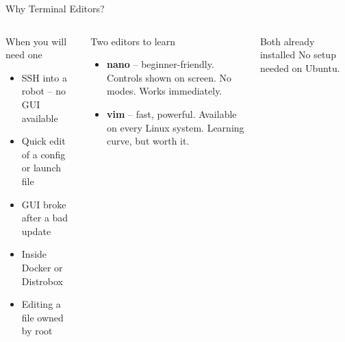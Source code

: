 \documentclass[aspectratio=169]{beamer}
\begin{document}
\begin{frame}{Why Terminal Editors?}
  \begin{columns}
      \begin{alertblock}{When you will need one}
        \begin{itemize}
          \item SSH into a robot -- no GUI available
          \item Quick edit of a config or launch file
          \item GUI broke after a bad update
          \item Inside Docker or Distrobox
          \item Editing a file owned by root
        \end{itemize}
      \end{alertblock}
      \begin{block}{Two editors to learn}
        \begin{itemize}
          \item \textbf{nano} -- beginner-friendly.
                Controls shown on screen.
                No modes. Works immediately.
          \vspace{0.4em}
          \item \textbf{vim} -- fast, powerful.
                Available on every Linux system.
                Learning curve, but worth it.
        \end{itemize}
      \end{block}
      \vspace{0.4em}
      \begin{exampleblock}{Both already installed}
        No setup needed on Ubuntu.
      \end{exampleblock}
  \end{columns}
\end{frame}
\end{document}
